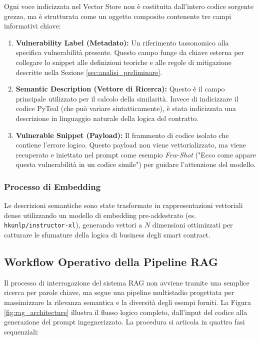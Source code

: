 Ogni voce indicizzata nel Vector Store non è costituita dall'intero codice sorgente grezzo, ma è strutturata come un oggetto composito contenente tre campi informativi chiave:

\begin{enumerate}
    \item \textbf{Vulnerability Label (Metadato):} Un riferimento tassonomico alla specifica vulnerabilità presente. Questo campo funge da chiave esterna per collegare lo snippet alle definizioni teoriche e alle regole di mitigazione descritte nella Sezione \ref{sec:analisi_preliminare}.
    
    \item \textbf{Semantic Description (Vettore di Ricerca):} 
    Questo è il campo principale utilizzato per il calcolo della similarità. Invece di indicizzare il codice PyTeal (che può variare sintatticamente), è stata indicizzata una descrizione in linguaggio naturale della logica del contratto.
    
    \item \textbf{Vulnerable Snippet (Payload):} Il frammento di codice isolato che contiene l'errore logico. Questo payload non viene vettorializzato, ma viene recuperato e iniettato nel prompt come esempio \textit{Few-Shot} ("Ecco come appare questa vulnerabilità in un codice simile") per guidare l'attenzione del modello.
\end{enumerate}

\subsubsection{Processo di Embedding}
Le descrizioni semantiche sono state trasformate in rappresentazioni vettoriali dense utilizzando un modello di embedding pre-addestrato (es. \texttt{hkunlp/instructor-xl}), generando vettori a $N$ dimensioni ottimizzati per catturare le sfumature della logica di business degli smart contract.


\subsection{Workflow Operativo della Pipeline RAG}
\label{sec:retrieval_workflow}

Il processo di interrogazione del sistema RAG non avviene tramite una semplice ricerca per parole chiave, ma segue una pipeline multistadio progettata per massimizzare la rilevanza semantica e la diversità degli esempi forniti. La Figura \ref{fig:rag_architecture} illustra il flusso logico completo, dall'input del codice alla generazione del prompt ingegnerizzato. La procedura si articola in quattro fasi sequenziali:

